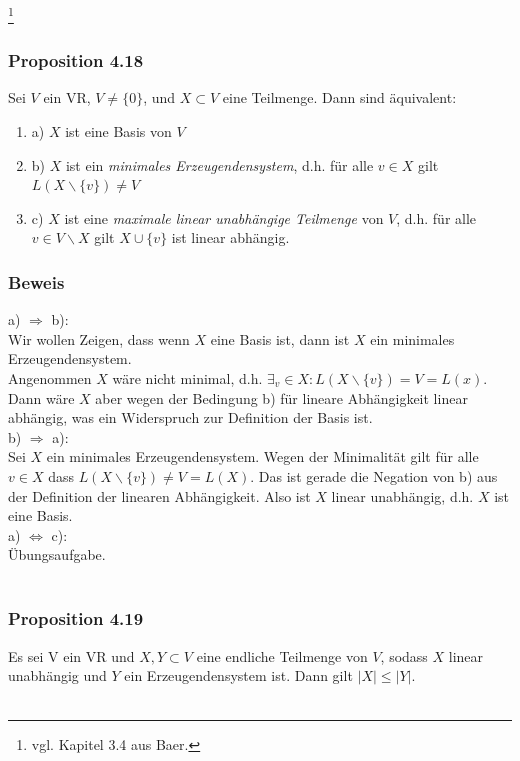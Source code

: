 \documentclass{article}
\begin{document}
\newpage
\date{Donnerstag, 11.01.24} \footnote{vgl. Kapitel 3.4 aus Baer.}
\subsubsection*{Proposition 4.18}
Sei $V$ ein VR, $V \neq \{0\}$, und $X \subset V$ eine Teilmenge. Dann sind äquivalent: \\
\begin{enumerate}
    \item a) $X$ ist eine Basis von $V$ \\
    \item b) $X$ ist ein \textit{minimales Erzeugendensystem}, d.h. für alle $v \in X$ gilt $L(X \backslash \{v\}) \neq V$ \\
    \item c) $X$ ist eine \textit{maximale linear unabhängige Teilmenge} von $V$, d.h. für alle $v \in V \backslash X$ gilt $X \cup \{v\}$ ist linear abhängig. \\
\end{enumerate}
\subsubsection*{Beweis}
a) $\Rightarrow$ b): \\
Wir wollen Zeigen, dass wenn $X$ eine Basis ist, dann ist $X$ ein minimales Erzeugendensystem. \\
Angenommen $X$ wäre nicht minimal, d.h. $\exists_v \in X: L(X \backslash \{v\}) = V = L(x)$. 
Dann wäre $X$ aber wegen der Bedingung b) für lineare Abhängigkeit linear abhängig, was ein Widerspruch zur Definition der Basis ist. \\
b) $\Rightarrow$ a): \\
Sei $X$ ein minimales Erzeugendensystem. Wegen der Minimalität gilt für alle $v \in X$ dass $L(X \backslash \{v\}) \neq V = L(X)$.
Das ist gerade die Negation von b) aus der Definition der linearen Abhängigkeit. Also ist $X$ linear unabhängig, d.h. $X$ ist eine Basis. \\
a) $\Leftrightarrow$ c): \\
Übungsaufgabe. \\
\\
\subsubsection*{Proposition 4.19}
Es sei V ein VR und $X, Y \subset V$ eine endliche Teilmenge von $V$, sodass $X$ linear unabhängig und $Y$ ein Erzeugendensystem ist. Dann gilt $|X| \leq |Y|$. \\
\\
\end{document}
